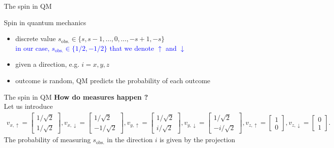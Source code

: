 \documentclass[9pt]{beamer}
\begin{document}
\begin{frame}{The spin in QM}
\begin{block}{Spin in quantum mechanics}
\begin{enumerate}
\begin{itemize}
 \item discrete value $s_{\text{obs.}}\in\{s,s-1,\dots,0,\dots,-s+1,-s\}$\\
              \textcolor{blue}{in our case, $s_{\text{obs.}}\in\{1/2,-1/2\}$ that we denote $\uparrow$ and $\downarrow$}
              \item given a direction, e.g. $i=x,y,z$
              \item outcome is random, QM predicts the probability of each outcome
            \end{itemize}
        \end{enumerate}
    \end{block}

\end{frame}

\begin{frame}{The spin in QM}
    \textbf{How do measures happen ?}\\[0.2cm]
    Let us introduce
    {\tiny
    \begin{align*}
        v_{x,\uparrow}=
        \begin{bmatrix}
            1/\sqrt{2} \\ 1/\sqrt{2}
        \end{bmatrix},
        v_{x,\downarrow }=
        \begin{bmatrix}
            1/\sqrt{2} \\ -1/\sqrt{2}
        \end{bmatrix},
        v_{y,\uparrow}=
        \begin{bmatrix}
            1/\sqrt{2} \\ i/\sqrt{2}
        \end{bmatrix},
        v_{y,\downarrow}=
        \begin{bmatrix}
            1/\sqrt{2} \\ -i/\sqrt{2}
        \end{bmatrix},
        v_{z,\uparrow}=
        \begin{bmatrix}
            1 \\ 0
        \end{bmatrix},
        v_{z,\downarrow}=
        \begin{bmatrix}
            0 \\ 1
        \end{bmatrix}.
    \end{align*}}
    The probability of measuring $s_{\text{obs.}}$ in the direction $i$ is given by the projection
    \begin{equation}

\end{equation}
\end{frame}
\end{document}
